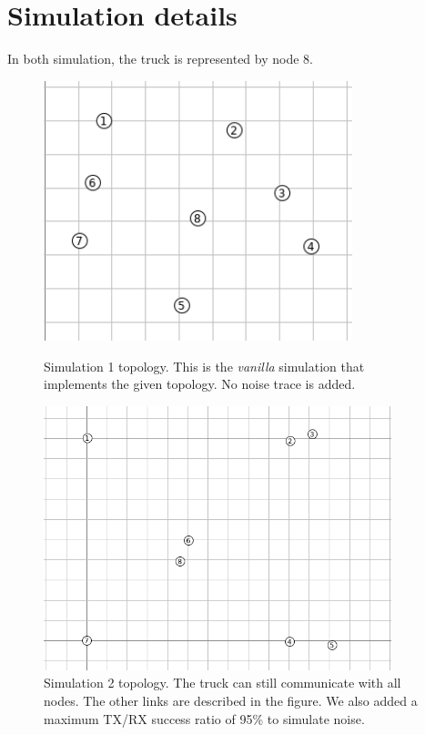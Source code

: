 \documentclass[a4paper, 11pt, parskip=half]{scrartcl}
\begin{document}
\section{Simulation details}

In both simulation, the truck is represented by node 8.

\begin{figure}[ht]
    \begin{minipage}[t]{0.47\textwidth}
        \centering
        \includegraphics[width=0.8\textwidth]{resources/sim1}
        \caption{Simulation 1 topology. This is the \textit{vanilla} simulation that implements the given topology. No noise trace is added.}
    \end{minipage}
    \hspace*{\fill}
    \begin{minipage}[t]{0.47\textwidth}
        \centering
        \includegraphics[width=0.9\textwidth]{resources/sim2}
        \caption{Simulation 2 topology. The truck can still communicate with all nodes. The other links are described in the figure. We also added a maximum TX/RX success ratio of 95\% to simulate noise.}
    \end{minipage}
\end{figure}
\end{document}
